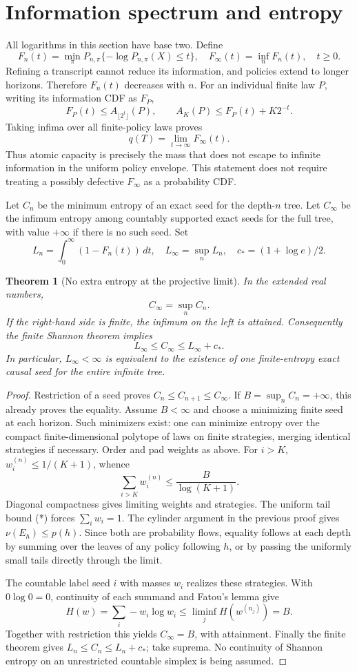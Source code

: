 \documentclass[11pt]{article}
\newtheorem{theorem}{Theorem}
\begin{document}
\section{Information spectrum and entropy}
All logarithms in this section have base two. Define
\[
 F_n(t)=\min_\pi P_{n,\pi}\{-\log P_{n,\pi}(X)\le t\},\quad
 F_\infty(t)=\inf_n F_n(t),\quad t\ge0.
\]
Refining a transcript cannot reduce its information, and policies extend
to longer horizons. Therefore $F_n(t)$ decreases with $n$.
For an individual finite law $P$, writing its information CDF as $F_P$,
\[
 F_P(t)\le A_{\lfloor2^t\rfloor}(P),\qquad
 A_K(P)\le F_P(t)+K2^{-t}.
\]
Taking infima over all finite-policy laws proves
\[
 \boxed{q(T)=\lim_{t\to\infty}F_\infty(t).}
\]
Thus atomic capacity is precisely the mass that does not escape to
infinite information in the uniform policy envelope. This statement
does not require treating a possibly defective $F_\infty$ as a
probability CDF.

Let $C_n$ be the minimum entropy of an exact seed for the depth-$n$
tree. Let $C_\infty$ be the infimum entropy among countably supported
exact seeds for the full tree, with value $+\infty$ if there is no such
seed. Set
\[
 L_n=\int_0^\infty(1-F_n(t))\,dt,\quad
 L_\infty=\sup_nL_n,\quad c_*=(1+\log e)/2.
\]

\begin{theorem}[No extra entropy at the projective limit]
In the extended real numbers,
\[
 \boxed{C_\infty=\sup_n C_n.}
\]
If the right-hand side is finite, the infimum on the left is attained.
Consequently the finite Shannon theorem implies
\[
 L_\infty\le C_\infty\le L_\infty+c_*.
\]
In particular, $L_\infty<\infty$ is equivalent to the existence of one
finite-entropy exact causal seed for the entire infinite tree.
\end{theorem}
\begin{proof}
Restriction of a seed proves $C_n\le C_{n+1}\le C_\infty$. If
$B=\sup_n C_n=+\infty$, this already proves the equality.
Assume $B<\infty$ and choose a minimizing finite seed at each horizon.
Such minimizers exist: one can minimize entropy over the compact
finite-dimensional polytope of laws on finite strategies, merging
identical strategies if necessary. Order and pad weights as above.
For $i>K$, $w_i^{(n)}\le1/(K+1)$, whence
\[
 \sum_{i>K}w_i^{(n)}\le \frac{B}{\log(K+1)}.\tag{*}
\]
Diagonal compactness gives limiting weights and strategies. The uniform
tail bound (*) forces $\sum_iw_i=1$. The cylinder argument in the
previous proof gives $\nu(E_h)\le p(h)$. Since both are probability
flows, equality follows at each depth by summing over the leaves of
any policy following $h$, or by passing the uniformly small tails
directly through the limit.

The countable label seed $i$ with masses $w_i$ realizes these strategies.
With $0\log0=0$, continuity of each summand and Fatou's lemma give
\[
 H(w)=\sum_i-w_i\log w_i
 \le\liminf_j H(w^{(n_j)})=B.
\]
Together with restriction this yields $C_\infty=B$, with attainment.
Finally the finite theorem gives $L_n\le C_n\le L_n+c_*$;
take suprema. No continuity of Shannon entropy on an unrestricted
countable simplex is being assumed.
\end{proof}
\end{document}
